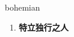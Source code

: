 
\begin{frame}
{\huge bohemian}
\begin{center}
\begin{enumerate}\Large
  \item \textbf{特立独行之人}
\end{enumerate}
\end{center}
\end{frame}
